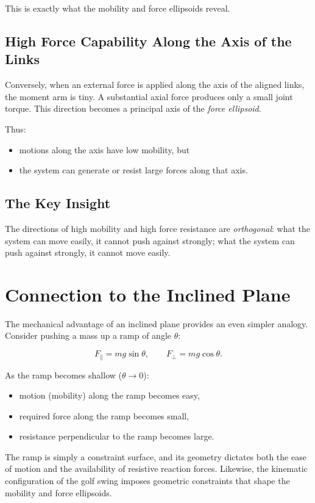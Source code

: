 \documentclass[12pt]{article}
\begin{document}
This is exactly what the mobility and force ellipsoids reveal.

\subsection{High Force Capability Along the Axis of the Links}

Conversely, when an external force is applied along the axis of the aligned 
links, the moment arm is tiny.  
A substantial axial force produces only a small joint torque.  
This direction becomes a principal axis of the \emph{force ellipsoid}.

Thus:
\begin{itemize}
    \item motions along the axis have low mobility, but
    \item the system can generate or resist large forces along that axis.
\end{itemize}

\subsection{The Key Insight}

The directions of high mobility and high force resistance are \emph{orthogonal}:  
what the system can move easily, it cannot push against strongly;  
what the system can push against strongly, it cannot move easily.

\section{Connection to the Inclined Plane}

The mechanical advantage of an inclined plane provides an even simpler analogy.  
Consider pushing a mass up a ramp of angle $\theta$:

\[
    F_{\parallel} = mg \sin\theta,
    \qquad
    F_{\perp} = mg \cos\theta.
\]

As the ramp becomes shallow ($\theta \to 0$):
\begin{itemize}
    \item motion (mobility) along the ramp becomes easy,
    \item required force along the ramp becomes small,
    \item resistance perpendicular to the ramp becomes large.
\end{itemize}

The ramp is simply a constraint surface, and its geometry dictates both the ease 
of motion and the availability of resistive reaction forces.  
Likewise, the kinematic configuration of the golf swing imposes geometric 
constraints that shape the mobility and force ellipsoids.
\end{document}
